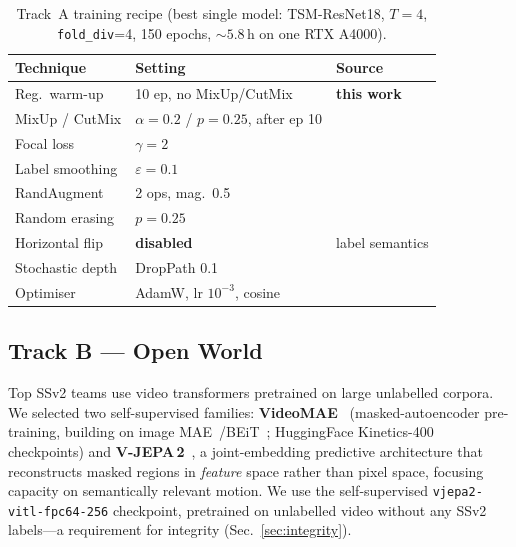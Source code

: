 \documentclass[10pt,twocolumn,letterpaper]{article}
\begin{document}
\begin{table}[t]
\centering\small
\setlength{\tabcolsep}{4pt}
\begin{tabular}{@{}lll@{}}
\toprule
Technique & Setting & Source \\
\midrule
Reg.\ warm-up      & 10 ep, no MixUp/CutMix & \textbf{this work} \\
MixUp / CutMix     & $\alpha{=}0.2$ / $p{=}0.25$, after ep 10 & \cite{zhang2018mixup,yun2019cutmix} \\
Focal loss         & $\gamma{=}2$ & \cite{lin2017focal} \\
Label smoothing    & $\varepsilon{=}0.1$ & \cite{muller2019labelsmooth} \\
RandAugment        & 2 ops, mag.\ 0.5 & \cite{cubuk2020randaugment} \\
Random erasing     & $p{=}0.25$ & \cite{zhong2020randomerase} \\
Horizontal flip    & \textbf{disabled} & label semantics \\
Stochastic depth   & DropPath 0.1 & \cite{huang2016stochdepth} \\
Optimiser          & AdamW, lr $10^{-3}$, cosine & \cite{loshchilov2019adamw} \\
\bottomrule
\end{tabular}
\caption{Track~A training recipe (best single model: TSM-ResNet18, $T{=}4$,
\texttt{fold\_div}=4, 150 epochs, ${\sim}5.8$\,h on one RTX A4000).}
\label{tab:recipe}
\end{table}

\subsection{Track B --- Open World}
\label{sec:trackB}
Top SSv2 teams use video transformers pretrained on large unlabelled corpora.
We selected two self-supervised families: \textbf{VideoMAE}~\cite{tong2022videomae}
(masked-autoencoder pre-training, building on image
MAE~\cite{he2022mae}/BEiT~\cite{bao2022beit}; HuggingFace Kinetics-400
checkpoints) and \textbf{V-JEPA\,2}~\cite{bardes2025vjepa2}, a joint-embedding
predictive architecture that reconstructs masked regions in \emph{feature} space
rather than pixel space, focusing capacity on semantically relevant motion. We
use the self-supervised \texttt{vjepa2-vitl-fpc64-256} checkpoint, pretrained on
unlabelled video without any SSv2 labels---a requirement for integrity
(Sec.~\ref{sec:integrity}).
\end{document}

